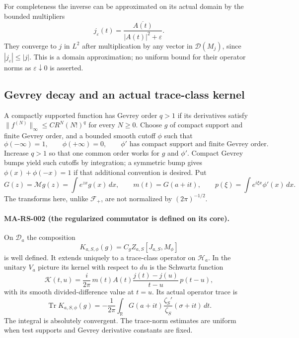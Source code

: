 For completeness the inverse can be approximated on its
actual domain by the bounded multipliers
\[
                j_\varepsilon(t)
                  =\frac{\overline{A(t)}}{|A(t)|^2+\varepsilon}.
 \tag{MA-RS.12}
\]
They converge to $j$ in $L^2$ after multiplication by any
vector in $\mathcal D(M_j)$, since $|j_\varepsilon|\le|j|$.
This is a domain approximation; no uniform bound for their
operator norms as $\varepsilon\downarrow0$ is asserted.

\subsection{Gevrey decay and an actual trace-class kernel}

A compactly supported function has Gevrey order $q>1$
if its derivatives satisfy
$\|f^{(N)}\|_\infty\le C R^N(N!)^q$ for every $N\ge0$.
Choose $g$ of compact support and finite Gevrey order,
and a bounded smooth cutoff $\phi$ such that
\[
 \phi(-\infty)=1,\qquad \phi(+\infty)=0,\qquad
                 \phi'\text{ has compact support and finite Gevrey order}.
 \tag{MA-RS.13}
\]
Increase $q>1$ so that one common order works for $g$ and
$\phi'$.  Compact Gevrey bumps yield such cutoffs by
integration; a symmetric bump gives
$\phi(x)+\phi(-x)=1$ if that additional convention is desired.
Put
\[
 G(z)=\mathcal Mg(z)=\int e^{zx}g(x)\,dx,\qquad
 m(t)=G(a+it),\qquad
 p(\xi)=\int e^{i\xi x}\phi'(x)\,dx .
 \tag{MA-RS.14}
\]
The transforms here, unlike $\mathcal F_+$, are not
normalized by $(2\pi)^{-1/2}$.

\paragraph{MA-RS-002 (the regularized commutator is defined on its core).}
On $\mathscr D_a$ the composition
\[
           K_{a,S,\phi}(g)
              =C_gZ_{a,S}[J_{a,S},M_\phi]
 \tag{MA-RS.15}
\]
is well defined.  It extends uniquely to a trace-class
operator on $\mathcal H_a$.  In the unitary $V_a$ picture
its kernel with respect to $du$ is the Schwartz function
\[
 \mathcal K(t,u)=\frac{i}{2\pi}\,
          m(t)A(t)\frac{j(t)-j(u)}{t-u}\,p(t-u),
 \tag{MA-RS.16}
\]
with its smooth divided-difference value at $t=u$.
Its actual operator trace is
\[
       \operatorname{Tr}K_{a,S,\phi}(g)
        =-\frac1{2\pi}\int_{\mathbb R}
               G(a+it)\frac{\zeta_S'}{\zeta_S}(\sigma+it)\,dt .
 \tag{MA-RS.17}
\]
The integral is absolutely convergent.  The trace-norm
estimates are uniform when test supports and Gevrey
derivative constants are fixed.


